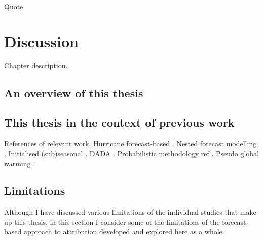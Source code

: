 \begin{savequote}[8cm]
    Quote
\end{savequote}
    
\chapter{\label{discussion}Discussion} 

Chapter description.

\minitoc

\clearpage

\section{An overview of this thesis}

  \blindtext

\section{This thesis in the context of previous work}

  References of relevant work. Hurricane forecast-based \citep{reed_attribution_2022,reed_forecasted_2020,patricola_anthropogenic_2018,lackmann_hurricane_2015,takayabu_climate_2015}. Nested forecast modelling \citep{schaller_role_2020,meredith_crucial_2015}. Initialised (sub)seasonal \citep{hope_contributors_2015,hope_what_2016,hope_determining_2019,hope_subseasonal_2022,wang_initialized_2021,tradowsky_toward_2022,stone_effect_2022}. DADA \citep{hannart_dada_2016}. Probabilistic methodology ref \citep{pall_anthropogenic_2011}. Pseudo global warming \citep{schar_surrogate_1996}.

\section{Limitations}

  Although I have discussed various limitations of the individual studies that make up this thesis, in this section I consider some of the limitations of the forecast-based approach to attribution developed and explored here as a whole.

